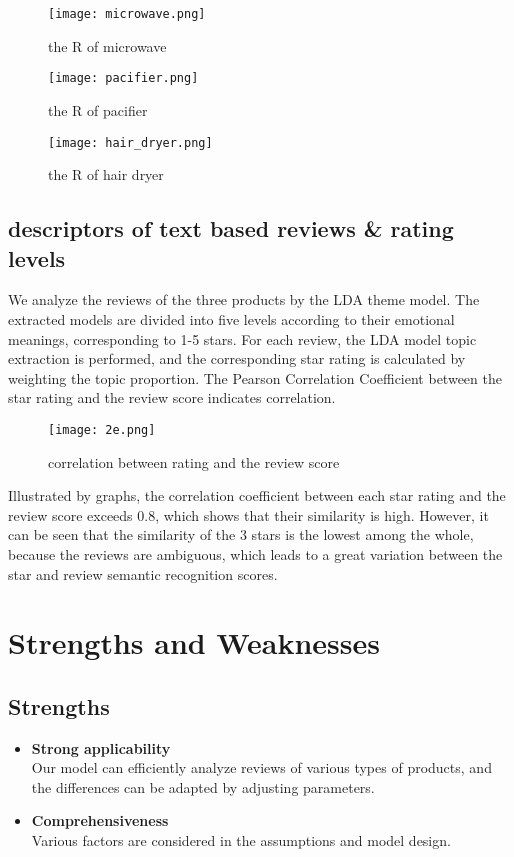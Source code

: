 \documentclass{mcmthesis}
\begin{document}
\begin{figure}[h]
  \small
  \centering
  \texttt{[image: microwave.png]}
  \caption{the R of microwave}
\end{figure}
\begin{figure}[h]
  \small
  \centering
  \texttt{[image: pacifier.png]}
  \caption{the R of pacifier}
\end{figure}
\begin{figure}[h]
  \small
  \centering
  \texttt{[image: hair\_dryer.png]}
  \caption{the R of hair dryer}
\end{figure}

\subsection{descriptors of text based reviews \& rating levels}
We analyze the reviews of the three products by the LDA theme model. The extracted models are divided into five levels according to their emotional meanings, corresponding to 1-5 stars. For each review, the LDA model topic extraction is performed, and the corresponding star rating is calculated by weighting the topic proportion. The Pearson Correlation Coefficient between the star rating and the review score indicates correlation.

\begin{figure}[h]
  \small
  \centering
  \texttt{[image: 2e.png]}
  \caption{correlation between rating and the review score}
\end{figure}

Illustrated by graphs, the correlation coefficient between each star rating and the review score exceeds 0.8, which shows that their similarity is high. However, it can be seen that the similarity of the 3 stars is the lowest among the whole, because the reviews are ambiguous, which leads to a great variation between the star and review semantic recognition scores.

\section{Strengths and Weaknesses}
\subsection{Strengths}
\begin{itemize}
  \item \textbf{Strong applicability}\\
   Our model can efficiently analyze reviews of various types of products, and the differences can be adapted by adjusting parameters.
  \item \textbf{Comprehensiveness}\\
  Various factors are considered in the assumptions and model design.
\end{itemize}
\end{document}
